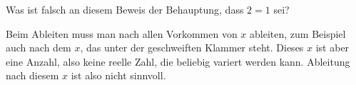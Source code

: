 Was ist falsch an diesem Beweis der Behauptung, dass $2=1$ sei?
\begin{center}
\end{center}

\begin{loesung}
Beim Ableiten muss man nach allen Vorkommen von $x$ ableiten, zum
Beispiel auch nach dem $x$, das unter der geschweiften Klammer steht.
Dieses $x$ ist aber eine Anzahl, also keine reelle Zahl, die beliebig
variert werden kann.
Ableitung nach diesem $x$ ist also nicht sinnvoll.
\end{loesung}
